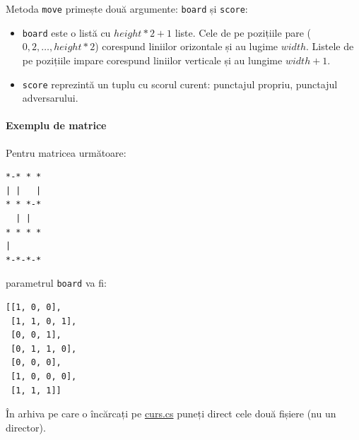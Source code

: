 \documentclass[12pt]{article}
\begin{document}
Metoda \texttt{move} primește două argumente: \texttt{board} și \texttt{score}:
\begin{itemize}
\item \texttt{board} este o listă cu $height * 2 + 1$ liste. Cele de
  pe pozițiile pare ($0, 2, \ldots, height * 2$) corespund liniilor
  orizontale și au lugime $width$. Listele de pe pozițiile impare
  corespund liniilor verticale și au lungime $width + 1$.
\item \texttt{score} reprezintă un tuplu cu scorul curent: punctajul
  propriu, punctajul adversarului.
\end{itemize}

\paragraph{Exemplu de matrice}

Pentru matricea următoare:
\begin{verbatim}
*-* * *
| |   |
* * *-*
  | |  
* * * *
|      
*-*-*-*
\end{verbatim}
parametrul \texttt{board} va fi:
\begin{verbatim}
[[1, 0, 0],
 [1, 1, 0, 1],
 [0, 0, 1],
 [0, 1, 1, 0],
 [0, 0, 0],
 [1, 0, 0, 0],
 [1, 1, 1]]
\end{verbatim}

În arhiva pe care o încărcați pe \url{curs.cs} puneți direct cele două
fișiere (nu un director).
\end{document}
